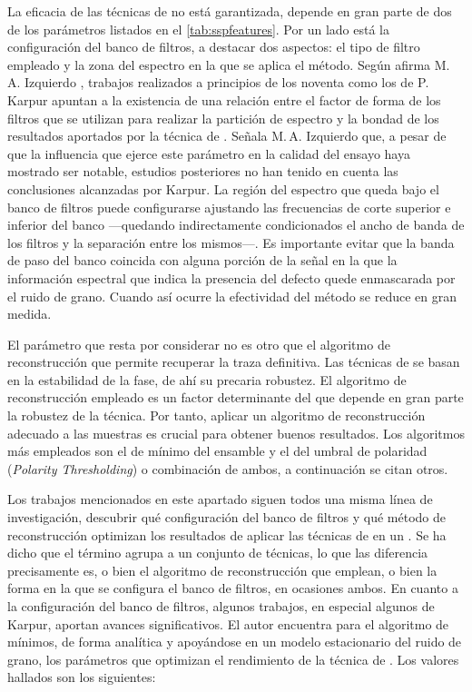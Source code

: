 La eficacia de las técnicas de  no está garantizada, depende en
gran parte de dos de los parámetros listados en el \cref{tab:sspfeatures}.
Por un lado está la configuración del banco de filtros, a destacar dos
aspectos: el tipo de filtro empleado y la zona del espectro en la que se
aplica el método. Según afirma M.\,A. Izquierdo
\citep[en][]{garcia2000mrsr}, trabajos realizados a principios de los
noventa como los de P.\,Karpur apuntan a la existencia de una relación
entre el factor de forma de los filtros que se utilizan para realizar la
partición de espectro y la bondad de los resultados aportados por la
técnica de . Señala M.\,A. Izquierdo que, a pesar de que la
influencia que ejerce este parámetro en la calidad del ensayo haya mostrado
ser notable, estudios posteriores no han tenido en cuenta las conclusiones
alcanzadas por Karpur. La región del espectro que queda bajo el banco de
filtros puede configurarse ajustando las frecuencias de corte superior e
inferior del banco ---quedando indirectamente condicionados el ancho de
banda de los filtros y la separación entre los mismos---. Es importante
evitar que la banda de paso del banco coincida con alguna porción de la
señal en la que la información espectral que indica la presencia del
defecto quede enmascarada por el ruido de grano. Cuando así ocurre la
efectividad del método se reduce en gran medida.

El parámetro que resta por considerar no es otro que el algoritmo de
reconstrucción que permite recuperar la traza definitiva. Las técnicas de
 se basan en la estabilidad de la fase, de ahí su precaria
robustez. El algoritmo de reconstrucción empleado es un factor determinante
del que depende en gran parte la robustez de la técnica. Por tanto, aplicar
un algoritmo de reconstrucción adecuado a las muestras es crucial para
obtener buenos resultados. Los algoritmos más empleados son el de mínimo
del ensamble y el del umbral de polaridad (\emph{Polarity Thresholding}) o
combinación de ambos, a continuación se citan otros.

Los trabajos mencionados en este apartado siguen todos una misma línea de
investigación, descubrir qué configuración del banco de filtros y qué
método de reconstrucción optimizan los resultados de aplicar las técnicas
de  en un . Se ha dicho que el término  agrupa
a un conjunto de técnicas, lo que las diferencia precisamente es, o bien el
algoritmo de reconstrucción que emplean, o bien la forma en la que se
configura el banco de filtros, en ocasiones ambos. En cuanto a la
configuración del banco de filtros, algunos trabajos, en especial algunos
de Karpur, aportan avances significativos. El autor encuentra para el
algoritmo de mínimos, de forma analítica y apoyándose en un modelo
estacionario del ruido de grano, los parámetros que optimizan el
rendimiento de la técnica de . Los valores hallados son los
siguientes:

